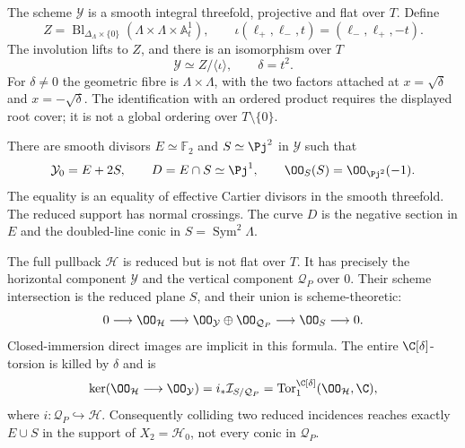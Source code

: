 \begin{theorem}
\label{thm:collision-family-v164}
The scheme $\mathcal Y$ is a smooth integral threefold, projective
and flat over $T$. Define
\begin{equation}\label{eq:ordered-blowup-v164}
 Z=\operatorname{Bl}_{\Delta_\Lambda\times\{0\}}
           (\Lambda\times\Lambda\times\mathbb A^1_t),\qquad
 \iota(\ell_+,\ell_-,t)=(\ell_-,\ell_+,-t).
\end{equation}
The involution lifts to $Z$, and there is an isomorphism over $T$
\begin{equation}\label{eq:quotient-model-v164}
             \mathcal Y\simeq Z/\langle\iota\rangle,
                         \qquad \delta=t^2.
\end{equation}
For $\delta\ne0$ the geometric fibre is $\Lambda\times\Lambda$,
with the two factors attached at $x=\sqrt\delta$ and $x=-\sqrt\delta$.
The identification with an ordered product requires the displayed
root cover; it is not a global ordering over $T\setminus\{0\}$.

There are smooth divisors $E\simeq\mathbb F_2$ and $S\simeq\Pj^2$
in $\mathcal Y$ such that
\begin{equation}\label{eq:horizontal-special-v164}
       \mathcal Y_0=E+2S,\qquad
       D=E\cap S\simeq\Pj^1,\qquad
       \OO_S(S)=\OO_{\Pj^2}(-1).
\end{equation}
The equality is an equality of effective Cartier divisors in the
smooth threefold. The reduced support has normal crossings.
The curve $D$ is the negative section in $E$ and the doubled-line
conic in $S=\operatorname{Sym}^2\Lambda$.

The full pullback $\mathcal H$ is reduced but is not flat over $T$.
It has precisely the horizontal component $\mathcal Y$ and the
vertical component $\mathcal Q_P$ over $0$. Their scheme intersection
is the reduced plane $S$, and their union is scheme-theoretic:
\begin{equation}\label{eq:collision-union-v164}
 0\longrightarrow\OO_{\mathcal H}\longrightarrow
 \OO_{\mathcal Y}\oplus\OO_{\mathcal Q_P}
 \longrightarrow\OO_S\longrightarrow0.
\end{equation}
Closed-immersion direct images are implicit in this formula. The
entire $\C[\delta]$-torsion is killed by $\delta$ and is
\begin{equation}\label{eq:collision-torsion-v164}
 \ker(\OO_{\mathcal H}\longrightarrow\OO_{\mathcal Y})
  =i_*\mathcal I_{S/\mathcal Q_P}
  =\operatorname{Tor}^{\C[\delta]}_1(\OO_{\mathcal H},\C),
\end{equation}
where $i:\mathcal Q_P\hookrightarrow\mathcal H$.
Consequently colliding two reduced incidences reaches exactly
$E\cup S$ in the support of $X_2=\mathcal H_0$, not every conic
in $\mathcal Q_P$.
\end{theorem}

